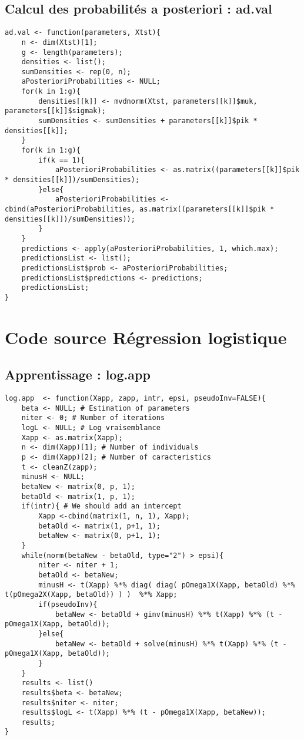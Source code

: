 \documentclass{article}
\begin{document}
\begin{multicols}{2}
\subsection{Calcul des probabilités a posteriori : ad.val}
\label{app_subsec_ad_probabilites_a_posteriori}

\begin{lstlisting}
ad.val <- function(parameters, Xtst){
	n <- dim(Xtst)[1];
	g <- length(parameters);
	densities <- list();
	sumDensities <- rep(0, n);
	aPosterioriProbabilities <- NULL;
	for(k in 1:g){
		densities[[k]] <- mvdnorm(Xtst, parameters[[k]]$muk, parameters[[k]]$sigmak);
		sumDensities <- sumDensities + parameters[[k]]$pik * densities[[k]];
	}
	for(k in 1:g){
		if(k == 1){
			aPosterioriProbabilities <- as.matrix((parameters[[k]]$pik * densities[[k]])/sumDensities);
		}else{
			aPosterioriProbabilities <- cbind(aPosterioriProbabilities, as.matrix((parameters[[k]]$pik * densities[[k]])/sumDensities));
		}
	}
	predictions <- apply(aPosterioriProbabilities, 1, which.max);
	predictionsList <- list();
	predictionsList$prob <- aPosterioriProbabilities;
	predictionsList$predictions <- predictions;
	predictionsList;
}
\end{lstlisting}

\section{Code source Régression logistique}
\label{app_sec_reg_log}

\subsection{Apprentissage : log.app}
\label{app_subsec_reg_log_app}

\begin{lstlisting}
log.app  <- function(Xapp, zapp, intr, epsi, pseudoInv=FALSE){
	beta <- NULL; # Estimation of parameters
	niter <- 0; # Number of iterations
	logL <- NULL; # Log vraisemblance
	Xapp <- as.matrix(Xapp);
	n <- dim(Xapp)[1]; # Number of individuals
	p <- dim(Xapp)[2]; # Number of caracteristics
	t <- cleanZ(zapp);	
	minusH <- NULL;
	betaNew <- matrix(0, p, 1);
	betaOld <- matrix(1, p, 1);
	if(intr){ # We should add an intercept
		Xapp <-cbind(matrix(1, n, 1), Xapp);
		betaOld <- matrix(1, p+1, 1);
		betaNew <- matrix(0, p+1, 1);
	}	
	while(norm(betaNew - betaOld, type="2") > epsi){
		niter <- niter + 1;
		betaOld <- betaNew;
		minusH <- t(Xapp) %*% diag( diag( pOmega1X(Xapp, betaOld) %*% t(pOmega2X(Xapp, betaOld)) ) )  %*% Xapp;
		if(pseudoInv){
			betaNew <- betaOld + ginv(minusH) %*% t(Xapp) %*% (t - pOmega1X(Xapp, betaOld));
		}else{
			betaNew <- betaOld + solve(minusH) %*% t(Xapp) %*% (t - pOmega1X(Xapp, betaOld));
		}	
	}
	results <- list()
	results$beta <- betaNew;
	results$niter <- niter;
	results$logL <- t(Xapp) %*% (t - pOmega1X(Xapp, betaNew));
	results;
}
\end{lstlisting}


\end{multicols}
\end{document}
